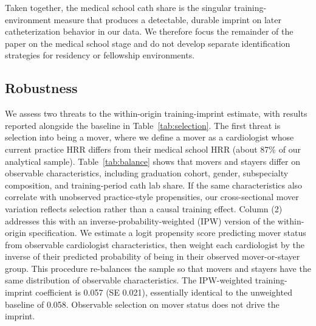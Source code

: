\documentclass[12pt]{article}
\begin{document}
Taken together, the medical school cath share is the singular training-environment measure that produces a detectable, durable imprint on later catheterization behavior in our data. We therefore focus the remainder of the paper on the medical school stage and do not develop separate identification strategies for residency or fellowship environments.

\subsection{Robustness}\label{sec:imprint-robust}

We assess two threats to the within-origin training-imprint estimate, with results reported alongside the baseline in Table~\ref{tab:selection}. The first threat is selection into being a mover, where we define a mover as a cardiologist whose current practice HRR differs from their medical school HRR (about 87\% of our analytical sample). Table~\ref{tab:balance} shows that movers and stayers differ on observable characteristics, including graduation cohort, gender, subspecialty composition, and training-period cath lab share. If the same characteristics also correlate with unobserved practice-style propensities, our cross-sectional mover variation reflects selection rather than a causal training effect. Column (2) addresses this with an inverse-probability-weighted (IPW) version of the within-origin specification. We estimate a logit propensity score predicting mover status from observable cardiologist characteristics, then weight each cardiologist by the inverse of their predicted probability of being in their observed mover-or-stayer group. This procedure re-balances the sample so that movers and stayers have the same distribution of observable characteristics. The IPW-weighted training-imprint coefficient is 0.057 (SE 0.021), essentially identical to the unweighted baseline of 0.058. Observable selection on mover status does not drive the imprint.
\end{document}

